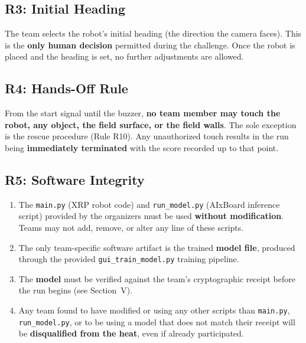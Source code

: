 \documentclass[a4]{article}
\begin{document}
\subsection*{R3: Initial Heading}
The team selects the robot's initial heading (the direction the camera faces). This is the \textbf{only human decision} permitted during the challenge. Once the robot is placed and the heading is set, no further adjustments are allowed.

\subsection*{R4: Hands-Off Rule}
From the start signal until the buzzer, \textbf{no team member may touch the robot, any object, the field surface, or the field walls}. The sole exception is the rescue procedure (Rule R10). Any unauthorized touch results in the run being \textbf{immediately terminated} with the score recorded up to that point.

\subsection*{R5: Software Integrity}
\begin{enumerate}[label=\alph*)]
    \item The \texttt{main.py} (XRP robot code) and \texttt{run\_model.py} (AIxBoard inference script) provided by the organizers must be used \textbf{without modification}. Teams may not add, remove, or alter any line of these scripts.
    \item The only team-specific software artifact is the trained \textbf{model file}, produced through the provided \texttt{gui\_train\_model.py} training pipeline.
    \item The \textbf{model} must be verified against the team's cryptographic receipt before the run begins (see Section~V).
    \item Any team found to have modified or using any other scripts than \texttt{main.py}, \texttt{run\_model.py}, or to be using a model that does not match their receipt will be \textbf{disqualified from the heat}, even if already participated. 
\end{enumerate}
\end{document}
